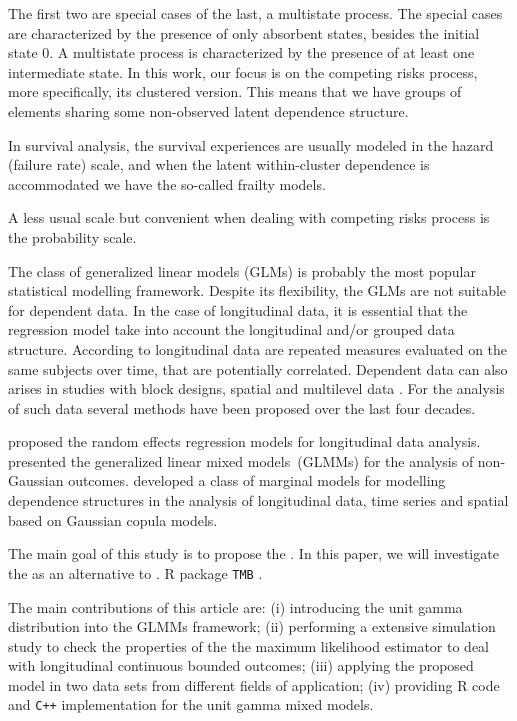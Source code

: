 \documentclass[a4paper,12pt]{article}
\begin{document}
The first two are special cases of the last, a multistate process. The
special cases are characterized by the presence of only absorbent
states, besides the initial state 0. A multistate process is
characterized by the presence of at least one intermediate state. In
this work, our focus is on the competing risks process, more
specifically, its clustered version. This means that we have groups of
elements sharing some non-observed latent dependence structure.

In survival analysis, the survival experiences are usually modeled in
the hazard (failure rate) scale, and when the latent within-cluster
dependence is accommodated we have the so-called frailty models.

A less usual scale but convenient when dealing with competing risks
process is the probability scale.

The class of generalized linear models (GLMs) \citep{GLM72} is probably
the most popular statistical modelling framework. Despite its
flexibility, the GLMs are not suitable for dependent data. In the case
of longitudinal data, it is essential that the regression model take
into account the longitudinal and/or grouped data structure. According
to \cite{diggle02} longitudinal data are repeated measures evaluated on
the same subjects over time, that are potentially correlated. Dependent
data can also arises in studies with block designs, spatial and
multilevel data \citep{verbeke&molenberghs,fitzmaurice}. For the
analysis of such data several methods have been proposed over the last
four decades.

\cite{laird82} proposed the random effects regression models for
longitudinal data analysis. \cite{breslow93} presented the generalized
linear mixed models~(GLMMs) for the analysis of non-Gaussian
outcomes. \cite{gcmr} developed a class of marginal models for modelling
dependence structures in the analysis of longitudinal data, time series
and spatial based on Gaussian copula models.

The main goal of this study is to propose the . In this paper, we will
investigate the as an alternative to . R \citep{R21} package
\texttt{TMB} \citep{TMb}.

The main contributions of this article are: (i) introducing the unit
gamma distribution into the GLMMs framework; (ii) performing a extensive
simulation study to check the properties of the the maximum likelihood
estimator to deal with longitudinal continuous bounded outcomes; (iii)
applying the proposed model in two data sets from different fields of
application; (iv) providing R code and \texttt{C++} implementation for
the unit gamma mixed models.
\end{document}
